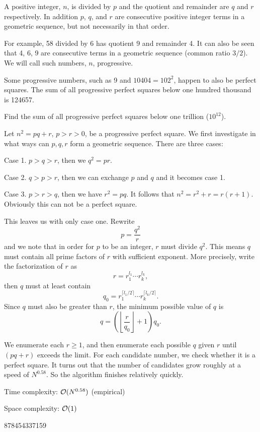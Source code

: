 




A positive integer, $n$, is divided by $p$ and the quotient and remainder are $q$ and $r$ respectively. In addition $p$, $q$, and $r$ are consecutive positive integer terms in a geometric sequence, but not necessarily in that order.

For example, 58 divided by 6 has quotient 9 and remainder 4. It can also be seen that 4, 6, 9 are consecutive terms in a geometric sequence (common ratio $3/2$). We will call such numbers, $n$, progressive.

Some progressive numbers, such as 9 and $10404 = 102^2$, happen to also be perfect squares.
The sum of all progressive perfect squares below one hundred thousand is 124657.

Find the sum of all progressive perfect squares below one trillion ($10^{12}$).

\solution

Let $n^2 = pq + r$, $p > r > 0$, be a progressive perfect square. We first investigate in what ways can $p, q, r$ form a geometric sequence. There are three cases:

Case 1. $p > q > r$, then we $q^2 = pr$.

Case 2. $q > p > r$, then we can exchange $p$ and $q$ and it becomes case 1.

Case 3. $p > r > q$, then we have $r^2 = pq$. It follows that $n^2 = r^2+r = r(r+1)$. Obviously this can not be a perfect square.

This leaves us with only case one. Rewrite
\[
p = \frac{q^2}{r}
\]
and we note that in order for $p$ to be an integer, $r$ must divide $q^2$. This means $q$ must contain all prime factors of $r$ with sufficient exponent. More precisely, write the factorization of $r$ as
\[
r = r_1^{l_1} \cdots r_k^{l_k} ,
\]
then $q$ must at least contain
\[
q_0 = r_1^{\lceil l_1/2 \rceil} \cdots r_k^{\lceil l_k/2 \rceil} .
\]
Since $q$ must also be greater than $r$, the minimum possible value of $q$ is
\[
q = \left( \left\lfloor \frac{r}{q_0} \right\rfloor + 1\right) q_0 .
\]

We enumerate each $r \ge 1$, and then enumerate each possible $q$ given $r$ until $(pq+r)$ exceeds the limit. For each candidate number, we check whether it is a perfect square. It turns out that the number of candidates grow roughly at a speed of $N^{0.58}$. So the algorithm finishes relatively quickly.

\complexity

Time complexity: $\mathcal{O}(N^{0.58})$ (empirical)

Space complexity: $\mathcal{O}(1)$

\answer

878454337159


